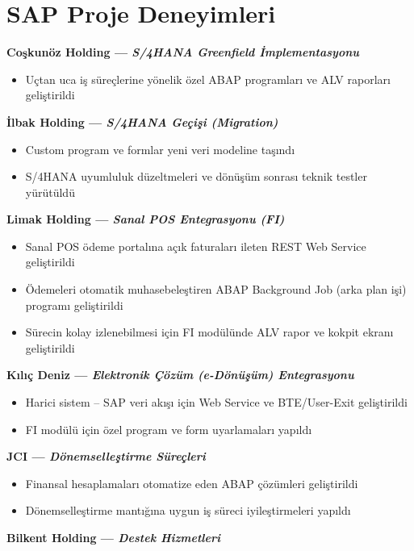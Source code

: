 \documentclass[10pt,a4paper]{extarticle}
\begin{document}
\section{SAP Proje Deneyimleri}
\textbf{Coşkunöz Holding \textnormal{--- \textit{S/4HANA Greenfield İmplementasyonu}}}
\begin{itemize}[leftmargin=*,noitemsep,topsep=0pt]
    \item Uçtan uca iş süreçlerine yönelik özel ABAP programları ve ALV raporları geliştirildi
\end{itemize}
\textbf{İlbak Holding \textnormal{--- \textit{S/4HANA Geçişi (Migration)}}}
\begin{itemize}[leftmargin=*,noitemsep,topsep=0pt]
    \item Custom program ve formlar yeni veri modeline taşındı
    \item S/4HANA uyumluluk düzeltmeleri ve dönüşüm sonrası teknik testler yürütüldü
\end{itemize}
\textbf{Limak Holding \textnormal{--- \textit{Sanal POS Entegrasyonu (FI)}}}
\begin{itemize}[leftmargin=*,noitemsep,topsep=0pt]
    \item Sanal POS ödeme portalına açık faturaları ileten REST Web Service geliştirildi
    \item Ödemeleri otomatik muhasebeleştiren ABAP Background Job (arka plan işi) programı geliştirildi
    \item Sürecin kolay izlenebilmesi için FI modülünde ALV rapor ve kokpit ekranı geliştirildi
\end{itemize}
\textbf{Kılıç Deniz \textnormal{--- \textit{Elektronik Çözüm (e-Dönüşüm) Entegrasyonu}}}
\begin{itemize}[leftmargin=*,noitemsep,topsep=0pt]
    \item Harici sistem -- SAP veri akışı için Web Service ve BTE/User-Exit geliştirildi
    \item FI modülü için özel program ve form uyarlamaları yapıldı
\end{itemize}
\textbf{JCI \textnormal{--- \textit{Dönemselleştirme Süreçleri}}}
\begin{itemize}[leftmargin=*,noitemsep,topsep=0pt]
    \item Finansal hesaplamaları otomatize eden ABAP çözümleri geliştirildi
    \item Dönemselleştirme mantığına uygun iş süreci iyileştirmeleri yapıldı
\end{itemize}
\textbf{Bilkent Holding \textnormal{--- \textit{Destek Hizmetleri}}}
\end{document}
